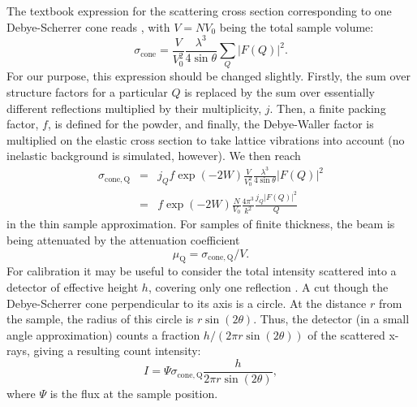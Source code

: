 The textbook expression for the scattering cross section
corresponding to one Debye-Scherrer cone reads \cite[ch.3.6]{squires}, with $V=N V_0$ being the total sample volume:
\begin{equation}
\sigma_\mathrm{cone}
  = \frac{V}{V_0^2} \frac{\lambda^3}{4 \sin \theta} \sum_Q |F(Q)|^2 .
\end{equation}
For our purpose, this expression should be changed slightly.
Firstly, the sum over structure factors for a particular $Q$ is replaced
by the sum over essentially different reflections multiplied by their
multiplicity, $j$. Then, a finite packing factor, $f$, is defined for the powder,
and finally, the Debye-Waller factor is multiplied on the elastic cross section
to take lattice vibrations into account (no inelastic background is simulated,
however). We then reach
\begin{eqnarray}
\sigma_\mathrm{cone, Q}
 & = & j_Q f \exp(-2W) \frac{V}{V_0^2} \frac{\lambda^3}{4 \sin \theta} |F(Q)|^2 \\
 & = & f \exp(-2W) \frac{N}{V_0} \frac{4\pi^3}{k^2} \frac{j_Q |F(Q)|^2}{Q}
\end{eqnarray}
in the thin sample approximation. For samples of finite thickness, the
beam is being attenuated by the attenuation coefficient
\begin{equation}
\label{e:attenu}
\mu_\mathrm{Q} = \sigma_\mathrm{cone,Q} / V .
\end{equation}
For calibration it may be useful to consider the total intensity
scattered into a detector of effective height $h$, covering only
one reflection \cite[ch.3.6]{squires}.
A cut though the Debye-Scherrer cone perpendicular to its axis
is a circle. At the distance $r$ from the sample, the radius of this
circle is $r \sin(2\theta)$. Thus, the detector (in a small angle
approximation) counts a fraction $h / (2 \pi r \sin(2 \theta))$
of the scattered x-rays, giving a resulting count intensity:
\begin{equation}
I = \Psi \sigma_\mathrm{cone,Q} \frac{h}{2 \pi r \sin(2\theta)} ,
\end{equation}
where $\Psi$ is the flux at the sample position.

